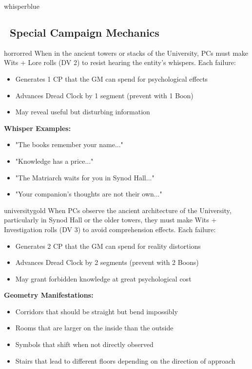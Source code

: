 \documentclass[11pt]{article}
\begin{document}
\begin{campaignsection}{whisperblue}
\subsection*{\faSkull\ Special Campaign Mechanics}

\begin{mechanicbox}{horrorred}
When in the ancient towers or stacks of the University, PCs must make Wits + Lore rolls (DV 2) to resist hearing the entity's whispers. Each failure:
\begin{itemize}
    \item Generates 1 CP that the GM can spend for psychological effects
    \item Advances Dread Clock by 1 segment (prevent with 1 Boon)
    \item May reveal useful but disturbing information
\end{itemize}
\textbf{Whisper Examples:}
\begin{itemize}
    \item "The books remember your name..."
    \item "Knowledge has a price..."
    \item "The Matriarch waits for you in Synod Hall..."
    \item "Your companion's thoughts are not their own..."
\end{itemize}
\end{mechanicbox}

\begin{mechanicbox}{universitygold}
When PCs observe the ancient architecture of the University, particularly in Synod Hall or the older towers, they must make Wits + Investigation rolls (DV 3) to avoid comprehension effects. Each failure:
\begin{itemize}
    \item Generates 2 CP that the GM can spend for reality distortions
    \item Advances Dread Clock by 2 segments (prevent with 2 Boons)
    \item May grant forbidden knowledge at great psychological cost
\end{itemize}
\textbf{Geometry Manifestations:}
\begin{itemize}
    \item Corridors that should be straight but bend impossibly
    \item Rooms that are larger on the inside than the outside
    \item Symbols that shift when not directly observed
    \item Stairs that lead to different floors depending on the direction of approach
\end{itemize}
\end{mechanicbox}


\end{campaignsection}
\end{document}

